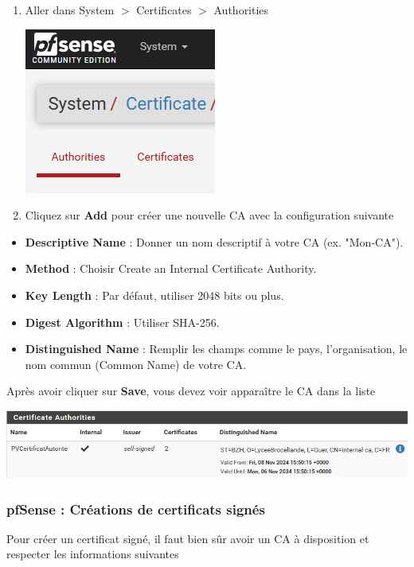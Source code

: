 \documentclass[french, 12pt]{article}%
\newcommand{\itemE}{\item[$\bullet$]}
\begin{document}
\begin{enumerate}
\item Aller dans System $>$ Certificates $>$ Authorities
\begin{center}
\includegraphics[scale=0.7]{./ressource/caPfsense}
\end{center}

\item Cliquez sur \textbf{Add} pour créer une nouvelle CA avec la configuration suivante

\end{enumerate}
\begin{itemize}
\itemE \textbf{Descriptive Name} : Donner un nom descriptif à votre CA (ex. "Mon-CA").
\itemE \textbf{Method} : Choisir Create an Internal Certificate Authority.
\itemE \textbf{Key Length} : Par défaut, utiliser 2048 bits ou plus.
\itemE \textbf{Digest Algorithm} : Utiliser SHA-256.
\itemE \textbf{Distinguished Name} : Remplir les champs comme le pays, l'organisation, le nom commun (Common Name) de votre CA.
\end{itemize}

Après avoir cliquer sur \textbf{Save}, vous devez voir apparaître le CA dans la liste

\begin{center}
\includegraphics[scale=0.7]{./ressource/CADescriptif}
\end{center}

\subsubsection{pfSense : Créations de certificats signés}

Pour créer un certificat signé, il faut bien sûr avoir un CA à disposition et respecter les informations suivantes
\end{document}
